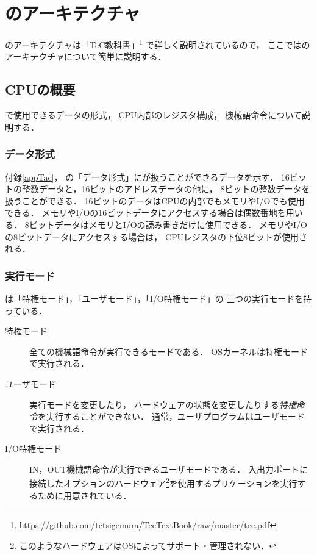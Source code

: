 \chapter{{\tac}のアーキテクチャ}

{\tec}のアーキテクチャは「TeC教科書」\footnote{
\url{https://github.com/tctsigemura/TecTextBook/raw/master/tec.pdf}}
で詳しく説明されているので，
ここでは{\tac}のアーキテクチャについて簡単に説明する．

\section{CPUの概要}
{\tac}で使用できるデータの形式，
CPU内部のレジスタ構成，
機械語命令について説明する．

\subsection{データ形式}
付録\ref{appTac}，
の「データ形式」に{\tac}が扱うことができるデータを示す．
16ビットの整数データと，16ビットのアドレスデータの他に，
8ビットの整数データを扱うことができる．
16ビットのデータはCPUの内部でもメモリやI/Oでも使用できる．
メモリやI/Oの16ビットデータにアクセスする場合は偶数番地を用いる．
8ビットデータはメモリとI/Oの読み書きだけに使用できる．
メモリやI/Oの8ビットデータにアクセスする場合は，
CPUレジスタの下位8ビットが使用される．

\subsection{実行モード}
{\tac}は「特権モード」，「ユーザモード」，「I/O特権モード」の
三つの実行モードを持っている．

\begin{description}
\item[特権モード]
全ての機械語命令が実行できるモードである．
OSカーネルは特権モードで実行される．
\item[ユーザモード]
実行モードを変更したり，
ハードウェアの状態を変更したりする\emph{特権命令}を実行することができない．
通常，ユーザプログラムはユーザモードで実行される．
\item[I/O特権モード]
IN，OUT機械語命令が実行できるユーザモードである．
入出力ポートに接続したオプションのハードウェア\footnote{
このようなハードウェアはOSによってサポート・管理されない．
}を使用するプリケーションを実行するために用意されている．
\end{description}

